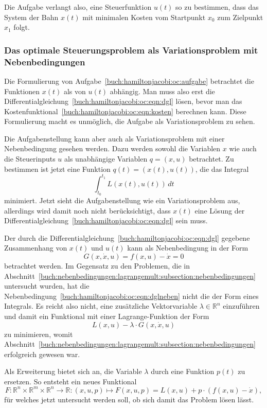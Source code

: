 Die Aufgabe verlangt also, eine Steuerfunktion $u(t)$ so zu bestimmen,
dass das System der Bahn $x(t)$ mit minimalen Kosten vom Startpunkt $x_0$
zum Zielpunkt $x_1$ folgt.

%
%
\subsubsection{Das optimale Steuerungsproblem als Variationsproblem
mit Nebenbedingungen}
Die Formulierung von Aufgabe~\ref{buch:hamiltonjacobi:oc:aufgabe}
betrachtet die Funktionen $x(t)$ als von $u(t)$ abhängig.
Man muss also erst die
Differentialgleichung~\eqref{buch:hamiltonjacobi:oc:eqn:dgl}
lösen, bevor man das
Kostenfunktional~\eqref{buch:hamiltonjacobi:oc:eqn:kosten}
berechnen kann.
Diese Formulierung macht es unmöglich, die Aufgabe als 
Variationsproblem zu sehen.

Die Aufgabenstellung kann aber auch als Variationsproblem mit
einer Nebenbedingung gesehen werden.
Dazu werden sowohl die Variablen $x$ wie auch die Steuerinputs $u$
als unabhängige Variablen $q=(x,u)$ betrachtet.
Zu bestimmen ist jetzt eine Funktion $q(t)=(x(t),u(t))$, die
das Integral
\[
\int_{t_0}^{t_1}
L(x(t), u(t))
\,dt
\]
minimiert.
Jetzt sieht die Aufgabenstellung wie ein Variationsproblem aus,
allerdings wird damit noch nicht berücksichtigt, dass $x(t)$ eine
Lösung der Differentialgleichung~\eqref{buch:hamiltonjacobi:oc:eqn:dgl}
sein muss.

Der durch die Differentialgleichung~\eqref{buch:hamiltonjacobi:oc:eqn:dgl}
gegebene Zusammenhang von $x(t)$ und $u(t)$ kann als Nebenbedingung 
in der Form
\begin{equation}
G(x,\dot{x}, u)
=
f(x,u) - \dot{x} = 0
\label{buch:hamiltonjacobi:oc:eqn:dglneben}
\end{equation}
betrachtet werden.
Im Gegensatz zu den Problemen, die in
Abschnitt~\ref{buch:nebenbedingungen:lagrangemult:subsection:nebenbedingungen}
untersucht wurden, hat die
Nebenbedingung~\eqref{buch:hamiltonjacobi:oc:eqn:dglneben}
nicht die der Form eines Integrals.
Es reicht also nicht, eine zusätzliche Vektorvariable $\lambda\in\mathbb{R}^n$
einzuführen und damit ein Funktional mit einer Lagrange-Funktion der Form
\[
L(x,u) - \lambda \cdot G(x,\dot{x},u)
\]
zu minimieren, womit
Abschnitt~\ref{buch:nebenbedingungen:lagrangemult:subsection:nebenbedingungen}
erfolgreich gewesen war.

Als Erweiterung bietet sich an, die Variable $\lambda$ durch eine
Funktion $p(t)$ zu ersetzen.
So entsteht ein neues Funktional
\[
F
\colon
\mathbb{R}^n\times\mathbb{R}^m\times\mathbb{R}^n
\to\mathbb{R}
:
(x,u,p)
\mapsto
F(x,u,p)
=
L(x,u) + p\cdot (f(x,u) - \dot{x}),
\]
für welches jetzt untersucht werden soll, ob sich damit das Problem lösen
lässt.

